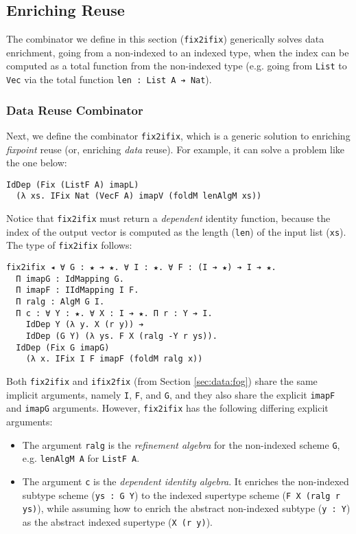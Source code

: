 \documentclass[acmsmall]{acmart}\settopmatter{}
\newcommand{\refsec}[1]{Section \ref{sec:#1}}
\newcommand{\labsec}[1]{\label{sec:#1}}
\begin{document}
\subsection{Enriching Reuse}
\labsec{data:enr}

The combinator we define in this section
(\verb;fix2ifix;) generically solves data enrichment, going from a
non-indexed to an indexed type, when the index can be
computed as a total function from the non-indexed type
(e.g. going from \verb;List; to \verb;Vec; via the total function
\verb;len : List A ➔ Nat;).

\subsubsection{Data Reuse Combinator}

Next, we define the combinator \verb;fix2ifix;, which
is a generic solution
to enriching \textit{fixpoint} reuse
(or, enriching \textit{data} reuse).
For example, it can solve a problem like the one below:
\begin{verbatim}
IdDep (Fix (ListF A) imapL)
  (λ xs. IFix Nat (VecF A) imapV (foldM lenAlgM xs))
\end{verbatim}
Notice that \verb;fix2ifix; must return a \textit{dependent} identity
function, because the index of the output vector is computed as the
length (\verb;len;) of the input list (\verb;xs;).
The type of \verb;fix2ifix; follows:
\begin{verbatim}
fix2ifix ◂ ∀ G : ★ ➔ ★. ∀ I : ★. ∀ F : (I ➔ ★) ➔ I ➔ ★.
  Π imapG : IdMapping G.
  Π imapF : IIdMapping I F. 
  Π ralg : AlgM G I. 
  Π c : ∀ Y : ★. ∀ X : I ➔ ★. Π r : Y ➔ I. 
    IdDep Y (λ y. X (r y)) ➔ 
    IdDep (G Y) (λ ys. F X (ralg -Y r ys)).
  IdDep (Fix G imapG) 
    (λ x. IFix I F imapF (foldM ralg x))
\end{verbatim}
Both \verb;fix2ifix; and \verb;ifix2fix; (from \refsec{data:fog})
share the same implicit arguments, namely \verb;I;, \verb;F;,
and \verb;G;, and they also share the explicit \verb;imapF; and
\verb;imapG; arguments. However, \verb;fix2ifix; has the following
differing explicit arguments:

\begin{itemize}
\item The argument \verb;ralg; is the
  \textit{refinement algebra} for the non-indexed scheme \verb;G;,
  e.g. \verb;lenAlgM A; for \verb;ListF A;.

\item The argument \verb;c; is the \textit{dependent identity algebra}. It
  enriches the non-indexed subtype scheme (\verb;ys : G Y;)
  to the indexed supertype scheme (\verb;F X (ralg r ys);),
  while assuming
  how to enrich the abstract non-indexed subtype (\verb;y : Y;) as
  the abstract indexed supertype (\verb;X (r y);).
\end{itemize}
\end{document}
